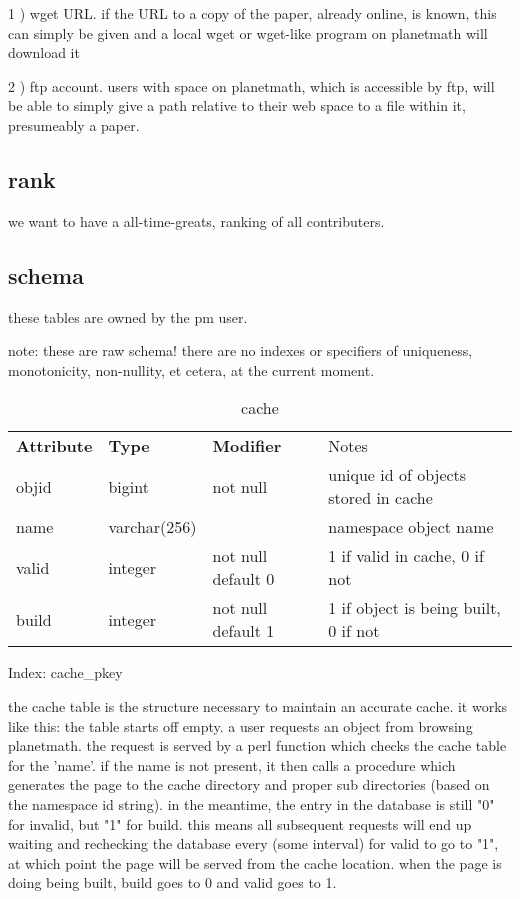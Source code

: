 1 ) wget URL. if the URL to a copy of the paper, already online, is known, this can simply be given and a local wget or wget-like program on planetmath will download it

2 ) ftp account.  users with space on planetmath, which is accessible by ftp, will be able to simply give a path relative to their web space to a file within it, presumeably a paper.

\subsection{rank}

we want to have a all-time-greats, ranking of all contributers. 

\subsection{schema}

these tables are owned by the pm user.

note: these are raw schema! there are no indexes or
specifiers of uniqueness, monotonicity, non-nullity, et
cetera, at the current moment.

\begin{table}
\begin{center}
\begin{tabular}{llll}
{\bf Attribute } & {\bf Type} & {\bf Modifier} & Notes \\
 objid     & bigint       & not null           &  unique id of objects stored in cache \\
 name      & varchar(256) &                    & namespace object name \\
 valid     & integer      & not null default 0 & 1 if valid in cache, 0 if not  \\
 build     & integer      & not null default 1 & 1 if object is being built, 0 if not \\
\end{tabular}
\end{center}
\caption{cache}
\end{table}

Index: cache\_pkey

the cache table is the structure necessary to maintain an accurate cache. it works like this: the table starts off empty. a user requests an object from browsing planetmath.  the request is served by a perl function which checks the cache table for the 'name'.  if the name is not present, it then calls a procedure which generates the page to the cache directory and proper sub directories (based on the namespace id string).  in the meantime, the entry in the database is still "0" for invalid, but "1" for build. this means all subsequent requests will end up waiting and rechecking the database every (some interval) for valid to go to "1", at which point the page will be served from the cache location.  when the page is doing being built, build goes to 0 and valid goes to 1.

